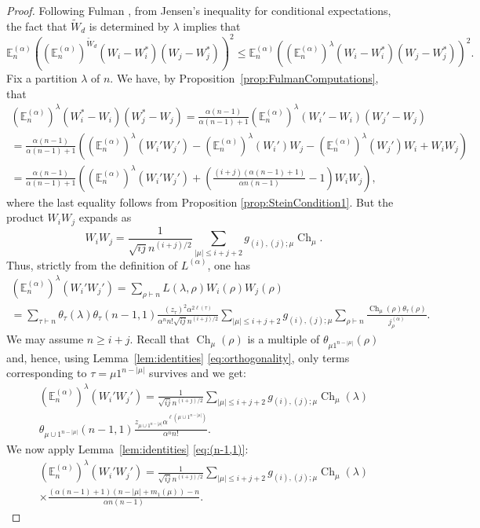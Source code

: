 \documentclass[11pt]{amsart}
\theoremstyle{plain}
\theoremstyle{remark}
\newcommand{\esper}{\mathbb{E}}
\DeclareMathOperator{\Ch}{Ch}
\begin{document}
\begin{proof}
Following Fulman \cite[Proof of Proposition 6.4]{FulmanFluctuationChA2},
from Jensen's inequality for conditional expectations,
the fact that $\tilde{W}_d$ is determined by $\lambda$ implies that
\[ \esper_n^{(\alpha)}\left((\esper_n^{(\alpha)})^{\tilde{W}_d}(W_i - W_i^*)(W_j - W_j^*)\right)^2 \leq \esper_n^{(\alpha)}\left((\esper_n^{(\alpha)})^\lambda(W_i - W_i^*)(W_j - W_j^*)\right)^2. \]
Fix a partition $\lambda$ of $n$. We have, by Proposition~\ref{prop:FulmanComputations}, that
\begin{multline}
\label{eq:blablabla}
(\esper_n^{(\alpha)})^\lambda(W_i^* - W_i)(W_j^* - W_j) = \frac{\alpha(n-1)}{\alpha(n-1)+1}(\esper_n^{(\alpha)})^\lambda(W_i' - W_i)(W_j' - W_j)\\
 = \frac{\alpha(n-1)}{\alpha(n-1)+1}\left( (\esper_n^{(\alpha)})^\lambda(W_i'W_j') - (\esper_n^{(\alpha)})^\lambda(W_i')W_j - (\esper_n^{(\alpha)})^\lambda(W_j')W_i + W_iW_j \right)\\
 = \frac{\alpha(n-1)}{\alpha(n-1)+1}\left( (\esper_n^{(\alpha)})^\lambda(W_i'W_j') + \left( \frac{(i+j)(\alpha(n-1)+1)}{\alpha n(n-1)}-1\right) W_iW_j \right),
 \end{multline}
where the last equality follows from Proposition \ref{prop:SteinCondition1}.
But the product $W_i W_j$ expands as
\begin{equation}
    W_i W_j = \frac{1}{\sqrt{ij} n^{(i+j)/2}} \sum_{|\mu| \leq i+j+2} g_{(i),(j); \mu} \Ch_\mu.
    \label{eq:prod_W}
\end{equation}
Thus, strictly from the definition of $L^{(\alpha)}$, one has
\begin{multline}
    (\esper_n^{(\alpha)})^\lambda(W_i'W_j') = \sum_{\rho \vdash n} L(\lambda,\rho) W_i(\rho) W_j(\rho)
    \\= \sum_{\tau \vdash n}\theta_\tau(\lambda)\theta_\tau(n-1,1)
    \frac{(z_\tau)^2\alpha^{2\ell(\tau)}}{\alpha^n n!\sqrt{ij} n^{(i+j)/2}}
 \sum_{|\mu| \leq i+j+2} g_{(i),(j); \mu} \sum_{\rho \vdash n}
\frac{\Ch_\mu(\rho)\theta_\tau(\rho)}{j_\rho^{(\alpha)}}.
\end{multline}
We may assume $n \ge i+j$.
Recall that $\Ch_\mu(\rho)$ is a multiple of $\theta_{\mu 1^{n-|\mu|}}(\rho)$
and, hence, using  Lemma~\ref{lem:identities} \eqref{eq:orthogonality},
only terms corresponding to $\tau=\mu 1^{n-|\mu|}$ survives
and we get:
\begin{multline}
    (\esper_n^{(\alpha)})^\lambda(W_i'W_j') =
    \frac{1}{\sqrt{ij} n^{(i+j)/2}} \sum_{|\mu| \leq i+j+2} g_{(i),(j); \mu} \Ch_\mu(\lambda)\\
    \theta_{\mu\cup 1^{n-|\mu|}}(n-1,1)
    \frac{z_{\mu\cup 1^{n-|\mu|}}\alpha^{\ell({\mu\cup 1^{n-|\mu|}})}}{\alpha^n n!}.
\end{multline}
We now apply Lemma~\ref{lem:identities} \eqref{eq:(n-1,1)}:
\begin{multline}
(\esper_n^{(\alpha)})^\lambda(W_i'W_j') = \frac{1}{\sqrt{ij} n^{(i+j)/2}} 
\sum_{|\mu| \le i+j+2} g_{(i),(j); \mu} \Ch_\mu(\lambda) \\
\times \frac{(\alpha(n-1)+1)(n-|\mu|+m_1(\mu))-n}{\alpha n(n-1)}.
\end{multline}


\end{proof}
\end{document}
